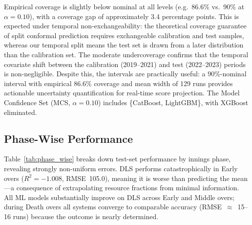 \documentclass[12pt,a4paper,oneside]{report}
\begin{document}
Empirical coverage is slightly below nominal at all levels (e.g.\ 86.6\% vs.\ 90\% at $\alpha=0.10$), with a coverage gap of approximately 3.4 percentage points.  This is expected under temporal non-exchangeability: the theoretical coverage guarantee of split conformal prediction requires exchangeable calibration and test samples, whereas our temporal split means the test set is drawn from a later distribution than the calibration set.  The moderate undercoverage confirms that the temporal covariate shift between the calibration (2019--2021) and test (2022--2023) periods is non-negligible.  Despite this, the intervals are practically useful: a 90\%-nominal interval with empirical 86.6\% coverage and mean width of 129 runs provides actionable uncertainty quantification for real-time score projection.  The Model Confidence Set (MCS, $\alpha=0.10$) includes \{CatBoost, LightGBM\}, with XGBoost eliminated.

\subsection{Phase-Wise Performance}

Table~\ref{tab:phase_wise} breaks down test-set performance by innings phase, revealing strongly non-uniform errors.  DLS performs catastrophically in Early overs ($R^2 = -1.008$, RMSE~105.0), meaning it is worse than predicting the mean—a consequence of extrapolating resource fractions from minimal information.  All ML models substantially improve on DLS across Early and Middle overs; during Death overs all systems converge to comparable accuracy (RMSE~$\approx$~15--16 runs) because the outcome is nearly determined.
\end{document}
